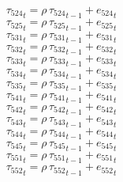 \begin{dmath}
{{\tau_{524}}}_{t}={{\rho}}\, {{\tau_{524}}}_{t-1}+{{e_{524}}}_{t}
\end{dmath}
\begin{dmath}
{{\tau_{525}}}_{t}={{\rho}}\, {{\tau_{525}}}_{t-1}+{{e_{525}}}_{t}
\end{dmath}
\begin{dmath}
{{\tau_{531}}}_{t}={{\rho}}\, {{\tau_{531}}}_{t-1}+{{e_{531}}}_{t}
\end{dmath}
\begin{dmath}
{{\tau_{532}}}_{t}={{\rho}}\, {{\tau_{532}}}_{t-1}+{{e_{532}}}_{t}
\end{dmath}
\begin{dmath}
{{\tau_{533}}}_{t}={{\rho}}\, {{\tau_{533}}}_{t-1}+{{e_{533}}}_{t}
\end{dmath}
\begin{dmath}
{{\tau_{534}}}_{t}={{\rho}}\, {{\tau_{534}}}_{t-1}+{{e_{534}}}_{t}
\end{dmath}
\begin{dmath}
{{\tau_{535}}}_{t}={{\rho}}\, {{\tau_{535}}}_{t-1}+{{e_{535}}}_{t}
\end{dmath}
\begin{dmath}
{{\tau_{541}}}_{t}={{\rho}}\, {{\tau_{541}}}_{t-1}+{{e_{541}}}_{t}
\end{dmath}
\begin{dmath}
{{\tau_{542}}}_{t}={{\rho}}\, {{\tau_{542}}}_{t-1}+{{e_{542}}}_{t}
\end{dmath}
\begin{dmath}
{{\tau_{543}}}_{t}={{\rho}}\, {{\tau_{543}}}_{t-1}+{{e_{543}}}_{t}
\end{dmath}
\begin{dmath}
{{\tau_{544}}}_{t}={{\rho}}\, {{\tau_{544}}}_{t-1}+{{e_{544}}}_{t}
\end{dmath}
\begin{dmath}
{{\tau_{545}}}_{t}={{\rho}}\, {{\tau_{545}}}_{t-1}+{{e_{545}}}_{t}
\end{dmath}
\begin{dmath}
{{\tau_{551}}}_{t}={{\rho}}\, {{\tau_{551}}}_{t-1}+{{e_{551}}}_{t}
\end{dmath}
\begin{dmath}
{{\tau_{552}}}_{t}={{\rho}}\, {{\tau_{552}}}_{t-1}+{{e_{552}}}_{t}
\end{dmath}
